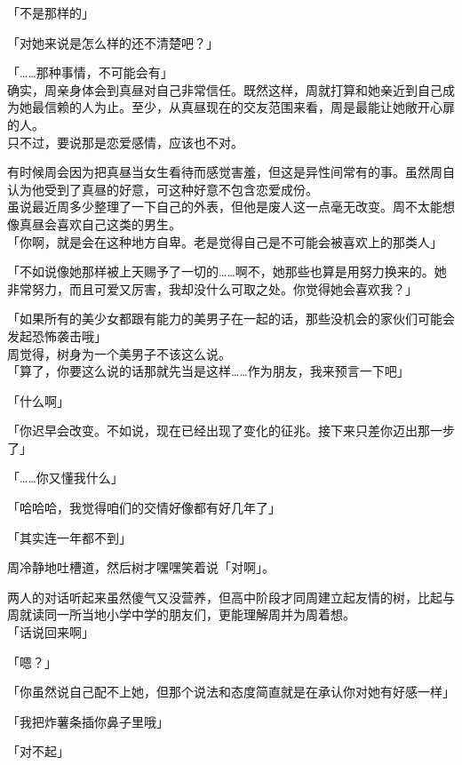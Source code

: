 「不是那样的」

「对她来说是怎么样的还不清楚吧？」

「……那种事情，不可能会有」\\

确实，周亲身体会到真昼对自己非常信任。既然这样，周就打算和她亲近到自己成为她最信赖的人为止。至少，从真昼现在的交友范围来看，周是最能让她敞开心扉的人。\\

只不过，要说那是恋爱感情，应该也不对。

有时候周会因为把真昼当女生看待而感觉害羞，但这是异性间常有的事。虽然周自认为他受到了真昼的好意，可这种好意不包含恋爱成份。\\

虽说最近周多少整理了一下自己的外表，但他是废人这一点毫无改变。周不太能想像真昼会喜欢自己这类的男生。\\

「你啊，就是会在这种地方自卑。老是觉得自己是不可能会被喜欢上的那类人」

「不如说像她那样被上天赐予了一切的……啊不，她那些也算是用努力换来的。她非常努力，而且可爱又厉害，我却没什么可取之处。你觉得她会喜欢我？」

「如果所有的美少女都跟有能力的美男子在一起的话，那些没机会的家伙们可能会发起恐怖袭击哦」\\

周觉得，树身为一个美男子不该这么说。\\

「算了，你要这么说的话那就先当是这样……作为朋友，我来预言一下吧」

「什么啊」

「你迟早会改变。不如说，现在已经出现了变化的征兆。接下来只差你迈出那一步了」

「……你又懂我什么」

「哈哈哈，我觉得咱们的交情好像都有好几年了」

「其实连一年都不到」

周冷静地吐槽道，然后树才嘿嘿笑着说「对啊」。

两人的对话听起来虽然傻气又没营养，但高中阶段才同周建立起友情的树，比起与周就读同一所当地小学中学的朋友们，更能理解周并为周着想。\\

「话说回来啊」

「嗯？」

「你虽然说自己配不上她，但那个说法和态度简直就是在承认你对她有好感一样」

「我把炸薯条插你鼻子里哦」

「对不起」\\

